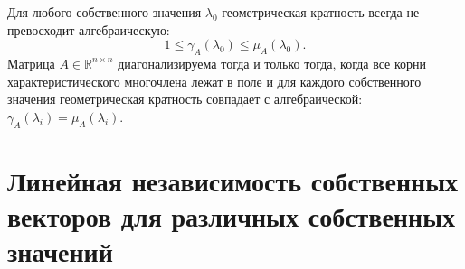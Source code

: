     \begin{theorem}
Для любого собственного значения $\lambda_0$ геометрическая кратность всегда не превосходит алгебраическую:
\[ 1 \le \gamma_A(\lambda_0) \le \mu_A(\lambda_0). \]
Матрица $A \in \mathbb{R}^{n \times n}$ диагонализируема тогда и только тогда, когда все корни характеристического
многочлена лежат в поле и для каждого собственного значения геометрическая кратность совпадает с алгебраической:
$\gamma_A(\lambda_i) = \mu_A(\lambda_i)$.
    \end{theorem}

    \section{Линейная независимость собственных векторов для различных собственных значений}

